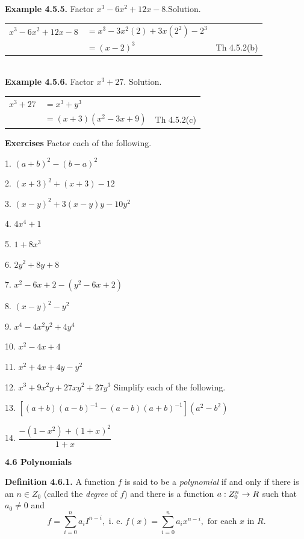 \textbf{Example 4.5.5.} Factor $x^{3} - 6x^{2} + 12x - 8.$\nl Solution.\nl

\begin{tabular}{r l l}
$x^{3} - 6x^{2} + 12x - 8$&$=x^{3} - 3x^{2}(2) + 3x(2^{2})- 2^{3}$&\\
&$=(x - 2)^{3}$&Th 4.5.2(b)\\
\end{tabular}\\

\textbf{Example 4.5.6.} Factor $x^{3}+27.$\nl
Solution.\nl

\begin{tabular}{r l l}
$x^{3}+27$&$= x^{3} + y^{3}$&\\
&$=(x + 3)(x^{2} - 3x + 9)$&Th 4.5.2(c)\\
\end{tabular}

\newpage
\textbf{Exercises}\nl
Factor each of the following. \nl

1. $(a+b)^{2} - (b-a)^{2}$\nl

2. $(x+3)^{2} + (x+3) - 12$\nl

3. $(x - y)^{2} + 3(x - y)y - 10y^{2}$\nl

4. $4x^{4} + 1$ \nl

5. $1 + 8x^{3}$\nl

6. $2y^{2} + 8y +8$\nl

7. $x^{2} - 6x + 2 -(y^{2} - 6x + 2)$\nl

8. $(x - y)^{2} - y^{2}$\nl

9. $x^{4} - 4x^{2}y^{2} + 4y^{4}$\nl

10. $x^{2} - 4x + 4 $\nl

11. $x^{2} + 4x + 4y - y^{2}$\nl

12. $x^{3} + 9x^{2}y + 27xy^{2} + 27y^{3}$\nl
Simplify each of the following.

13. $[(a+b)(a - b)^{-1} -(a-b)(a+b)^{-1}](a^{2} - b^{2})$\nl

14. $\dfrac{-(1 - x^{2})+ (1 + x)^{2}}{1 + x}$\nl

\vfill
\textbf{ 4.6 Polynomials}\nl

\textbf{Definition 4.6.1.}  A function $f$ is said to be a \textit{polynomial} if and only if there is an $n\in Z_{0}$ (called the \textit{degree} of $f$) and there is a function $a : Z_{0}^{n} \to R$ such that $a_{0} \neq 0$ and \nl
\[
f = \sum_{i = 0}^{n}a_{i}I^{n - i}, \text{~i. e.~} f(x) = \sum\limits_{i=0}^{n}a_{i}x^{n - i}, \text{~for~each~} x \text{~in~} R.
\]

